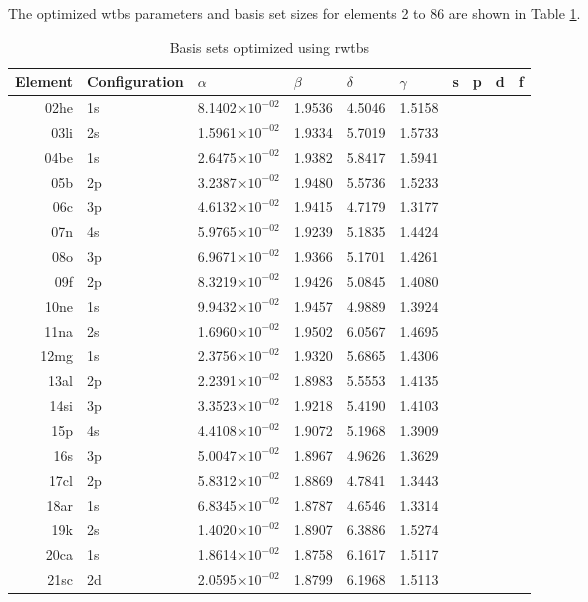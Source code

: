 \documentclass[12pt]{book}
\begin{document}
The optimized wtbs parameters and basis set sizes for elements 2 to 86 are shown in Table \ref{tab:BStab}.
\begin{center}
\singlespacing
\begin{longtable}{r l l l l l l l l l}
\caption{Basis sets optimized using rwtbs}\label{tab:BStab} \\
	Element	&	Configuration	&	$\alpha$	&	$\beta$	&	$\delta$	&	$\gamma$	&	s	&	p	&	d	&	f	\\
	\hline
	02he	&	1s	&	8.1402$\times10^{-02}$	&	1.9536	&	4.5046	&	1.5158 \\
	03li	&	2s	&	1.5961$\times10^{-02}$	&	1.9334	&	5.7019	&	1.5733 \\
	04be	&	1s	&	2.6475$\times10^{-02}$	&	1.9382	&	5.8417	&	1.5941 \\
	05b	  &	2p	&	3.2387$\times10^{-02}$	&	1.9480	&	5.5736	&	1.5233 \\
	06c	  &	3p	&	4.6132$\times10^{-02}$	&	1.9415	&	4.7179	&	1.3177 \\
	07n	  &	4s	&	5.9765$\times10^{-02}$	&	1.9239	&	5.1835	&	1.4424 \\
	08o	  &	3p	&	6.9671$\times10^{-02}$	&	1.9366	&	5.1701	&	1.4261 \\
	09f	  &	2p	&	8.3219$\times10^{-02}$	&	1.9426	&	5.0845	&	1.4080 \\
	10ne	&	1s	&	9.9432$\times10^{-02}$	&	1.9457	&	4.9889	&	1.3924 \\
	11na	&	2s	&	1.6960$\times10^{-02}$	&	1.9502	&	6.0567	&	1.4695 \\
	12mg&	1s	&	2.3756$\times10^{-02}$	&	1.9320	&	5.6865	&	1.4306 \\
	13al	&	2p	&	2.2391$\times10^{-02}$	&	1.8983	&	5.5553	&	1.4135 \\
	14si	&	3p	&	3.3523$\times10^{-02}$	&	1.9218	&	5.4190	&	1.4103 \\
	15p	  &	4s	&	4.4108$\times10^{-02}$	&	1.9072	&	5.1968	&	1.3909 \\
	16s	  &	3p	&	5.0047$\times10^{-02}$	&	1.8967	&	4.9626	&	1.3629 \\
	17cl	&	2p	&	5.8312$\times10^{-02}$	&	1.8869	&	4.7841	&	1.3443 \\
	18ar	&	1s	&	6.8345$\times10^{-02}$	&	1.8787	&	4.6546	&	1.3314 \\
	19k	  &	2s	&	1.4020$\times10^{-02}$	&	1.8907	&	6.3886	&	1.5274 \\
	20ca	&	1s	&	1.8614$\times10^{-02}$	&	1.8758	&	6.1617	&	1.5117 \\
	21sc	&	2d	&	2.0595$\times10^{-02}$	&	1.8799	&	6.1968	&	1.5113 \\

\end{longtable}
\end{center}
\end{document}
